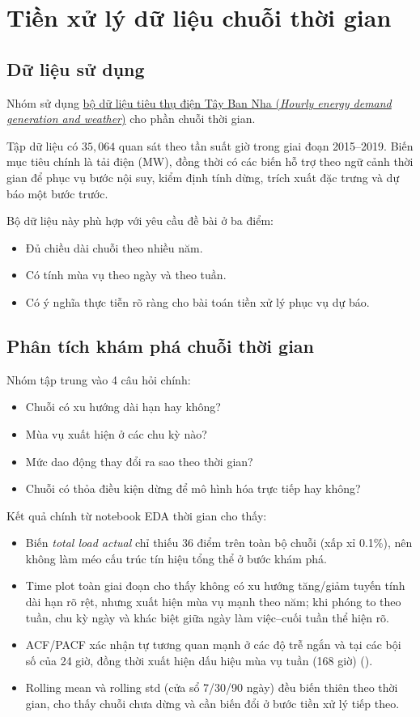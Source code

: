 \section{Tiền xử lý dữ liệu chuỗi thời gian}

\subsection{Dữ liệu sử dụng}
Nhóm sử dụng \href{https://www.kaggle.com/datasets/nicholasjhana/energy-consumption-generation-prices-and-weather/?select=energy_dataset.csv}{bộ dữ liệu tiêu thụ điện Tây Ban Nha (\textit{Hourly energy demand generation and weather})} cho phần chuỗi thời gian.

Tập dữ liệu có $35{,}064$ quan sát theo tần suất giờ trong giai đoạn 2015--2019. Biến mục tiêu chính là tải điện (MW), đồng thời có các biến hỗ trợ theo ngữ cảnh thời gian để phục vụ bước nội suy, kiểm định tính dừng, trích xuất đặc trưng và dự báo một bước trước.

Bộ dữ liệu này phù hợp với yêu cầu đề bài ở ba điểm:
\begin{itemize}
    \item Đủ chiều dài chuỗi theo nhiều năm.
    \item Có tính mùa vụ theo ngày và theo tuần.
    \item Có ý nghĩa thực tiễn rõ ràng cho bài toán tiền xử lý phục vụ dự báo.
\end{itemize}

\subsection{Phân tích khám phá chuỗi thời gian}
Nhóm tập trung vào 4 câu hỏi chính:
\begin{itemize}
    \item Chuỗi có xu hướng dài hạn hay không?
    \item Mùa vụ xuất hiện ở các chu kỳ nào?
    \item Mức dao động thay đổi ra sao theo thời gian?
    \item Chuỗi có thỏa điều kiện dừng để mô hình hóa trực tiếp hay không?
\end{itemize}

Kết quả chính từ notebook EDA thời gian cho thấy:
\begin{itemize}
    \item Biến \textit{total load actual} chỉ thiếu 36 điểm trên toàn bộ chuỗi (xấp xỉ 0.1\%), nên không làm méo cấu trúc tín hiệu tổng thể ở bước khám phá.
    \item Time plot toàn giai đoạn cho thấy không có xu hướng tăng/giảm tuyến tính dài hạn rõ rệt, nhưng xuất hiện mùa vụ mạnh theo năm; khi phóng to theo tuần, chu kỳ ngày và khác biệt giữa ngày làm việc--cuối tuần thể hiện rõ.
    \item ACF/PACF xác nhận tự tương quan mạnh ở các độ trễ ngắn và tại các bội số của 24 giờ, đồng thời xuất hiện dấu hiệu mùa vụ tuần (168 giờ) (\cite{box2015time}).
    \item Rolling mean và rolling std (cửa sổ 7/30/90 ngày) đều biến thiên theo thời gian, cho thấy chuỗi chưa dừng và cần biến đổi ở bước tiền xử lý tiếp theo.
\end{itemize}

